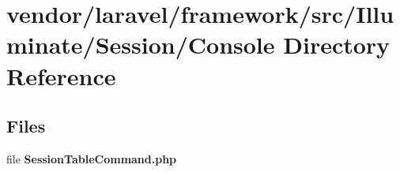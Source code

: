 \section{vendor/laravel/framework/src/\+Illuminate/\+Session/\+Console Directory Reference}
\label{dir_6d148ec1f4a16688090894e9516c9def}
\subsection*{Files}
\begin{DoxyCompactItemize}
\item 
file {\bf Session\+Table\+Command.\+php}
\end{DoxyCompactItemize}
